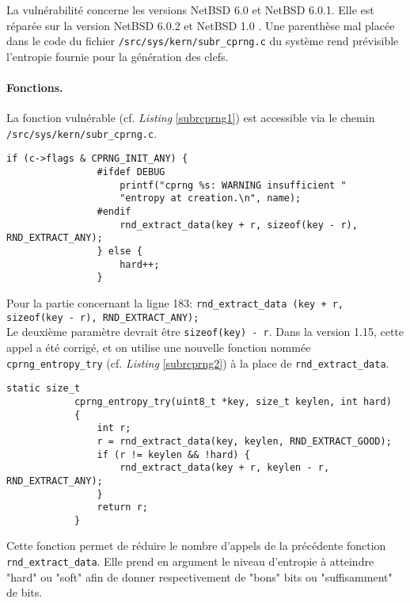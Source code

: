			La vulnérabilité concerne les versions NetBSD 6.0 et NetBSD 6.0.1. Elle est réparée sur la version NetBSD 6.0.2 et NetBSD 1.0 \cite{diffNetBSD}.	Une parenthèse mal placée dans le code du fichier \texttt{/src/sys/kern/subr\_cprng.c} du système rend prévisible l'entropie fournie pour la génération des clefs.\\
			
			\paragraph{Fonctions.\\} 
			
			La fonction vulnérable (cf. \textit{Listing} \ref{subrcprng1}) est accessible via le chemin \texttt{/src/sys/kern/subr\_cprng.c}.
			
			\begin{lstlisting}[style=customc,caption=subr\_cprng.c(1),
			 label=subrcprng1]
				if (c->flags & CPRNG_INIT_ANY) {
				#ifdef DEBUG
					printf("cprng %s: WARNING insufficient "
					"entropy at creation.\n", name);
				#endif
					rnd_extract_data(key + r, sizeof(key - r), RND_EXTRACT_ANY);
				} else {
					hard++;
				}
			\end{lstlisting}
			
			Pour la partie concernant la ligne 183: \texttt{rnd\_extract\_data (key + r, sizeof(key - r), RND\_EXTRACT\_ANY);}\\ 
			Le deuxième paramètre devrait être \texttt{sizeof(key) - r}.	Dans la version 1.15, cette appel a été corrigé, et on utilise une nouvelle fonction nommée \texttt{cprng\_entropy\_try} (cf. \textit{Listing} \ref{subrcprng2}) \cite{diffNetBSD} à la place de \texttt{rnd\_extract\_data}.
			
			\begin{lstlisting}[style=customc,caption=subr\_cprng.c(2), label=subrcprng2]
			static size_t
 	 		cprng_entropy_try(uint8_t *key, size_t keylen, int hard)
 	 		{
 	        	int r;
 	         	r = rnd_extract_data(key, keylen, RND_EXTRACT_GOOD);
 	         	if (r != keylen && !hard) {
 	            	rnd_extract_data(key + r, keylen - r, RND_EXTRACT_ANY);
 	         	}
 	    		return r;
 	    	}
			\end{lstlisting}

			Cette fonction permet de réduire le nombre d'appels de la précédente fonction \texttt{rnd\_extract\_data}. Elle prend en argument le niveau d'entropie à atteindre "hard" ou "soft" afin de donner respectivement de "bons" bits ou "suffisamment" de bits. 

